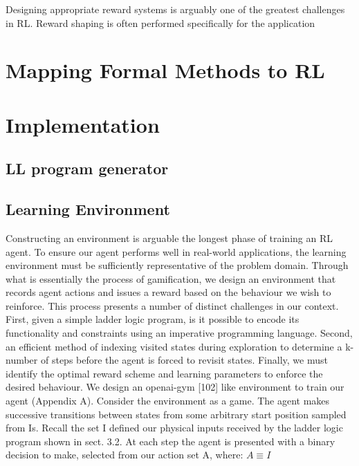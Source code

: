 \documentclass[runningheads]{llncs}
\begin{document}

Designing appropriate reward systems is arguably one of the greatest challenges in RL. Reward shaping is often performed specifically for the application


\section{Mapping Formal Methods to RL}


\section{Implementation}
\subsection{LL program generator}
\subsection{Learning Environment}
Constructing an environment is arguable the longest phase of training an RL agent. To
ensure our agent performs well in real-world applications, the learning environment must
be sufficiently representative of the problem domain. Through what is essentially the
process of gamification, we design an environment that records agent actions and issues a
reward based on the behaviour we wish to reinforce. This process presents a number of
distinct challenges in our context. First, given a simple ladder logic program, is it possible
to encode its functionality and constraints using an imperative programming language.
Second, an efficient method of indexing visited states during exploration to determine a
k-number of steps before the agent is forced to revisit states. Finally, we must identify the
optimal reward scheme and learning parameters to enforce the desired behaviour. We design an openai-gym [102] like environment to train our agent (Appendix A).
Consider the environment as a game. The agent makes successive transitions between
states from some arbitrary start position sampled from Is. Recall the set I  defined our physical inputs received by the ladder logic program shown in sect. 3.2. At each step the
agent is presented with a binary decision to make, selected from our action set A, where: $A \equiv I$
\end{document}
